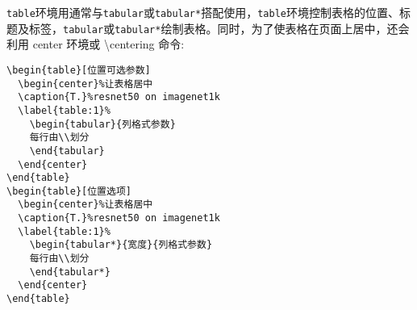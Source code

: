 \texttt{table}环境用通常与\texttt{tabular}或\texttt{tabular*}搭配使用，\texttt{table}环境控制表格的位置、标题及标签，\texttt{tabular}或\texttt{tabular*}绘制表格。同时，为了使表格在页面上居中，还会利用 center 环境或 \backslash centering 命令:
\begin{verbatim}
\begin{table}[位置可选参数]
  \begin{center}%让表格居中
  \caption{T.}%resnet50 on imagenet1k
  \label{table:1}%
    \begin{tabular}{列格式参数}
    每行由\\划分
    \end{tabular}
  \end{center}
\end{table}
\begin{table}[位置选项]
  \begin{center}%让表格居中
  \caption{T.}%resnet50 on imagenet1k
  \label{table:1}%
    \begin{tabular*}{宽度}{列格式参数}
    每行由\\划分
    \end{tabular*}
  \end{center}
\end{table}
\end{verbatim}


